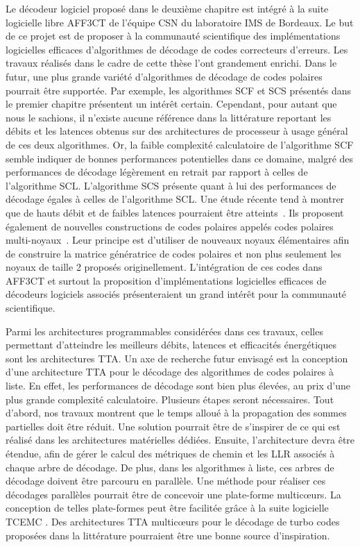 Le décodeur logiciel proposé dans le deuxième chapitre est intégré à la suite logicielle libre AFF3CT de l'équipe CSN du laboratoire IMS de Bordeaux. Le but de ce projet est de proposer à la communauté scientifique des implémentations logicielles efficaces d'algorithmes de décodage de codes correcteurs d'erreurs. Les travaux réalisés dans le cadre de cette thèse l'ont grandement enrichi. Dans le futur, une plus grande variété d'algorithmes de décodage de codes polaires pourrait être supportée. Par exemple, les algorithmes SCF et SCS présentés dans le premier chapitre présentent un intérêt certain. Cependant, pour autant que nous le sachions, il n'existe aucune référence dans la littérature reportant les débits et les latences obtenus sur des architectures de processeur à usage général de ces deux algorithmes. Or, la faible complexité calculatoire de l'algorithme SCF semble indiquer de bonnes performances potentielles dans ce domaine, malgré des performances de décodage légèrement en retrait par rapport à celles de l'algorithme SCL. L'algorithme SCS présente quant à lui des performances de décodage égales à celles de l'algorithme SCL. Une étude récente tend à montrer que de hauts débit et de faibles latences pourraient être atteints~\cite{8351832}. Ils proposent également de nouvelles constructions de codes polaires appelés codes polaires multi-noyaux~\cite{7962750,8254147}. Leur principe est d'utiliser de nouveaux noyaux élémentaires afin de construire la matrice génératrice de codes polaires et non plus seulement les noyaux de taille 2 proposés originellement. L'intégration de ces codes dans AFF3CT et surtout la proposition d'implémentations logicielles efficaces de décodeurs logiciels associés présenteraient un grand intérêt pour la communauté scientifique.

Parmi les architectures programmables considérées dans ces travaux, celles permettant d'atteindre les meilleurs débits, latences et efficacités énergétiques sont les architectures TTA.
Un axe de recherche futur envisagé est la conception d'une architecture TTA pour le décodage des algorithmes de codes polaires à liste.
En effet, les performances de décodage sont bien plus élevées, au prix d'une plus grande complexité calculatoire.
Plusieurs étapes seront nécessaires. Tout d'abord, nos travaux montrent que le temps alloué à la propagation des sommes partielles doit être réduit.
Une solution pourrait être de s'inspirer de ce qui est réalisé dans les architectures matérielles dédiées.
Ensuite, l'architecture devra être étendue, afin de gérer le calcul des métriques de chemin et les LLR associés à chaque arbre de décodage. De plus, dans les algorithmes à liste, ces arbres de décodage doivent être parcouru en parallèle. Une méthode pour réaliser ces décodages parallèles pourrait être de concevoir une plate-forme multicœurs. La conception de telles plate-formes peut être facilitée grâce à la suite logicielle TCEMC \cite{tcemc_2011}. Des architectures TTA multicœurs pour le décodage de turbo codes proposées dans la littérature \cite{kultala_turbo_2013} pourraient être une bonne source d'inspiration.

